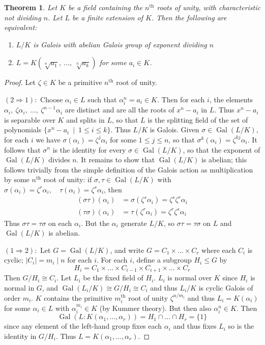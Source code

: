 \documentclass[12pt]{article}
\DeclareMathOperator{\Gal}{Gal}
\newcommand{\Order}[1]{\left\lvert #1 \right\rvert}
\newtheorem{thm}{Theorem}
\begin{document}
\begin{thm} Let $K$ be a field containing the $n^{\mathrm{th}}$ roots of unity, with characteristic not dividing $n$. Let $L$ be a finite extension of $K$. Then the following are equivalent:
\begin{enumerate}
\item $L/K$ is Galois with abelian Galois group of exponent dividing $n$
\item $L=K(\sqrt[n]{a_1},\ \dotsc,\ \sqrt[n]{a_k})$ for some $a_i\in K$.
\end{enumerate}
\end{thm}

\begin{proof} Let $\zeta\in K$ be a primitive $n^{\mathrm{th}}$ root of unity.

$(2\Rightarrow 1):$ Choose $\alpha_i\in L$ such that $\alpha_i^n = a_i\in K$. Then for each $i$, the elements $\alpha_i,\ \zeta\alpha_i,\ \dotsc,\ \zeta^{n-1}\alpha_i$ are distinct and are all the roots of $x^n-a_i$ in $L$. Thus $x^n-a_i$ is separable over $K$ and splits in $L$, so that $L$ is the splitting field of the set of polynomials $\{x^n-a_i\ \mid\ 1\leq i\leq k\}$. Thus $L/K$ is Galois. Given $\sigma\in \Gal(L/K)$, for each $i$ we have $\sigma(\alpha_i) = \zeta^j\alpha_i$ for some $1\leq j\leq n$, so that $\sigma^k(\alpha_i) = \zeta^{kj}\alpha_i$. It follows that $\sigma^n$ is the identity for every $\sigma\in\Gal(L/K)$, so that the exponent of $\Gal(L/K)$ divides $n$. It remains to show that $\Gal(L/K)$ is abelian; this follows trivially from the simple definition of the Galois action as multiplication by some $n^{\mathrm{th}}$ root of unity: if $\sigma,\tau\in\Gal(L/K)$ with $\sigma(\alpha_i) = \zeta^r\alpha_i,\quad\tau(\alpha_i) = \zeta^s\alpha_i$, then
\begin{align*}
  (\sigma\tau)(\alpha_i) &= \sigma(\zeta^s\alpha_i) = \zeta^s\zeta^r\alpha_i \\
  (\tau\sigma)(\alpha_i) &= \tau(\zeta^r\alpha_i) = \zeta^r\zeta^s\alpha_i
\end{align*}
Thus $\sigma\tau=\tau\sigma$ on each $\alpha_i$. But the $\alpha_i$ generate $L/K$, so $\sigma\tau=\tau\sigma$ on $L$ and $\Gal(L/K)$ is abelian.

$(1 \Rightarrow 2):$ Let $G=\Gal(L/K)$, and write $G=C_1\times \dots \times C_r$ where each $C_i$ is cyclic; $\Order{C_i}=m_i\mid n$ for each $i$. For each $i$, define a subgroup $H_i\leq G$ by
\[
  H_i = C_1 \times \dots \times C_{i-1} \times C_{i+1} \times \dots \times C_r
\]
Then $G/H_i \cong C_i$. Let $L_i$ be the fixed field of $H_i$. $L_i$ is normal over $K$ since $H_i$ is normal in $G$, and $\Gal(L_i/K) \cong G/H_i \cong C_i$ and thus $L_i/K$ is cyclic Galois of order $m_i$. $K$ contains the primitive $m_i^{\mathrm{th}}$ root of unity $\zeta^{n/m_i}$ and thus $L_i = K(\alpha_i)$ for some $\alpha_i\in L$ with $\alpha_i^{m_i}\in K$ (by Kummer theory). But then also $\alpha_i^n\in K$.  Then
\[
  \Gal(L:K(\alpha_1,\dotsc,\alpha_r)) = H_1\cap \dots \cap H_r = \{1\}
\]
since any element of the left-hand group fixes each $\alpha_i$ and thus fixes $L_i$ so is the identity in $G/H_i$. Thus $L=K(\alpha_1,\dotsc,\alpha_r)$.
\end{proof}
\end{document}
